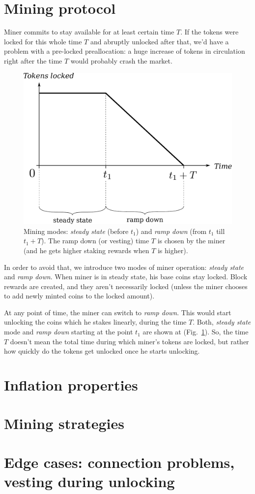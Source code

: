 \documentclass[longbibliography,nofootinbib,twocolumn]{revtex4-1}
\newcommand{\figref}[1]{Fig.~\ref{#1}}
\begin{document}
\section{Mining protocol}

Miner commits to stay available for at least certain time $T$.
If the tokens were locked for this whole time $T$ and abruptly unlocked after that, we'd have a problem with a pre-locked preallocation:
a huge increase of tokens in circulation right after the time $T$ would probably crash the market.

\begin{figure}
    \includegraphics[width=\columnwidth]{pdf/mining-modes.pdf}
    \caption{
        Mining modes: \emph{steady state} (before $t_1$) and \emph{ramp down} (from $t_1$ till $t_1 + T$).
        The ramp down (or vesting) time $T$ is chosen by the miner (and he gets higher staking rewards when $T$ is higher).
    }
    \label{fig:mining-modes}
\end{figure}

In order to avoid that, we introduce two modes of miner operation: \emph{steady state} and \emph{ramp down}.
When miner is in steady state, his base coins stay locked.
Block rewards are created, and they aren't necessarily locked (unless the miner chooses to add newly minted coins to the locked amount).

At any point of time, the miner can switch to \emph{ramp down}.
This would start unlocking the coins which he stakes linearly, during the time $T$.
Both, \emph{steady state} mode and \emph{ramp down} starting at the point $t_1$ are shown at (\figref{fig:mining-modes}).
So, the time $T$ doesn't mean the total time during which miner's tokens are locked, but rather how quickly do the tokens get unlocked once he starts
unlocking.


\section{Inflation properties}

\section{Mining strategies}

\section{Edge cases: connection problems, vesting during unlocking}


\end{document}
